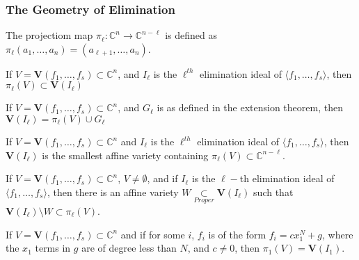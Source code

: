 \documentclass[crop=false,class=article,oneside]{standalone}
\begin{document}
        \subsubsection{The Geometry of Elimination}
            \begin{definition}
                    The projectiom map
                    $\pi_{\ell}:\mathbb{C}^{n}\rightarrow\mathbb{C}^{n-\ell}$
                    is defined as
                    $\pi_{\ell}(a_{1},\hdots,a_{n})=(a_{\ell+1},\hdots,a_{n})$.
            \end{definition}
            \begin{theorem}
                    If $V=\mathbf{V}(f_{1},\hdots,f_{s})\subset\mathbb{C}^{n}$,
                    and $I_{\ell}$ is the $\ell^{th}$ elimination ideal of
                    $\langle{f_{1},\hdots,f_{s}}\rangle$,
                    then $\pi_{\ell}(V)\subset\textbf{V}(I_{\ell})$
            \end{theorem}
            \begin{theorem}
                    If $V=\mathbf{V}(f_{1},\hdots,f_{s})\subset\mathbb{C}^{n}$,
                    and $G_{\ell}$ is as defined in the extension theorem,
                    then $\textbf{V}(I_{\ell})=\pi_{\ell}(V)\cup{G_{\ell}}$
            \end{theorem}
            \begin{theorem}
                    If $V=\mathbf{V}(f_{1},\hdots,f_{s})\subset\mathbb{C}^{n}$
                    and $I_{\ell}$ is the $\ell^{th}$ elimination ideal of
                    $\langle{f_{1},\hdots,f_{s}}\rangle$, then
                    $\textbf{V}(I_{\ell})$ is the smallest affine variety
                    containing $\pi_{\ell}(V)\subset\mathbb{C}^{n-\ell}$.
            \end{theorem}
            \begin{theorem}
            If $V = \mathbf{V}(f_1,\hdots, f_s) \subset \mathbb{C}^n$, $V\ne \emptyset$, and if $I_{\ell}$ is the $\ell-$th elimination ideal of $\langle f_1,\hdots, f_s\rangle$, then there is an affine variety $W\underset{Proper}{\subset} \textbf{V}(I_{\ell})$ such that $\textbf{V}(I_{\ell})\setminus W \subset \pi_{\ell}(V)$.
            \end{theorem}
            \begin{theorem}
            If $V = \mathbf{V}(f_1,\hdots, f_s)\subset \mathbb{C}^n$ and if for some $i$, $f_i$ is of the form $f_i = cx_1^N + g$, where the $x_1$ terms in $g$ are of degree less than $N$, and $c\ne 0$, then $\pi_{1}(V) = \textbf{V}(I_{1})$.
            \end{theorem}
\end{document}
